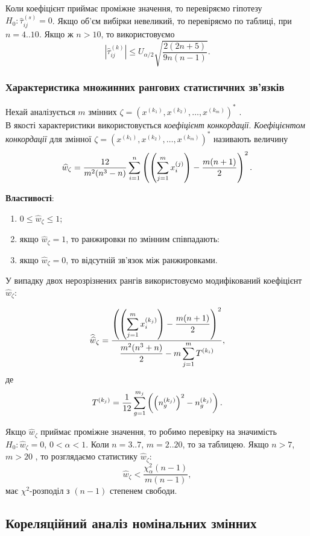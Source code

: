 Коли коефіцієнт приймає проміжне значення, то перевіряємо гіпотезу $H_0: \widehat{\tau}_{ij}^{(s)} = 0$. Якщо об'єм вибірки невеликий, то перевіряємо по таблиці, при $n = 4..10$. Якщо ж $n > 10$, то використовуємо \[\left|\widehat{\tau}_{ij}^{(k)}\right|\le U_{\alpha/2} \sqrt{\dfrac{2(2n+5)}{9n(n-1)}}. \]

\subsubsection{Характеристика множинних рангових статистичних зв'язків}

Нехай аналізується $m$ змінних $\zeta = \left(x^{(k_1)}, x^{(k_2)}, \ldots, x^{(k_m)}\right)^*$ . \\

В якості характеристики використовується \textit{коефіцієнт конкордації}. \textit{Коефіцієнтом конкордації} для змінної $\zeta = \left(x^{(k_1)}, x^{(k_2)}, \ldots, x^{(k_m)}\right)^*$  називають величину \[ \widehat{w}_\zeta = \dfrac{12}{m^2(n^3-n)}\displaystyle\sum\limits_{i=1}^n \left(\left(\displaystyle\sum\limits_{j=1}^m x_i^{(j)}\right)-\dfrac{m(n+1)}{2}\right)^2. \]

\textbf{Властивості}:
\begin{enumerate}
	\item $0 \le \widehat{w}_\zeta \le 1$;
	\item якщо $\widehat{w}_\zeta = 1$, то ранжировки по змінним співпадають:
	\item якщо $\widehat{w}_\zeta = 0$, то відсутній зв'язок між ранжировками.
\end{enumerate}

У випадку двох нерозрізнених рангів використовуємо модифікований коефіцієнт $\widehat{w}_\zeta$:

\[ \widehat{\widehat{w}}_\zeta = \dfrac{\left(\left(\displaystyle\sum\limits_{j=1}^m x_i^{(k_j)}\right)-\dfrac{m(n+1)}{2}\right)^2}{\dfrac{m^2(n^3+n)}{2}-m \displaystyle\sum\limits_{j=1}^m T^{(k_i)}}, \] де \[ T^{(k_j)} = \dfrac{1}{12} \displaystyle\sum\limits_{g=1}^{m_j} \left(\left(n_g^{(k_j)}\right)^2-n_g^{(k_j)}\right). \]

Якщо $\widehat{w}_\zeta$ приймає проміжне значення, то робимо перевірку на значимість $H_0: \widehat{w}_\zeta = 0$, $0 < \alpha < 1$. Коли $n = 3..7$, $m = 2..20$, то за таблицею. Якщо $n > 7$, $m > 20$ , то розглядаємо статистику $\widehat{w}_\zeta$: \[\widehat{w}_\zeta < \dfrac{\chi_\alpha^2(n-1)}{m(n-1)},\] має $\chi^2$-розподіл з $(n-1)$ степенем свободи.

\subsection{Кореляційний аналіз номінальних змінних}

